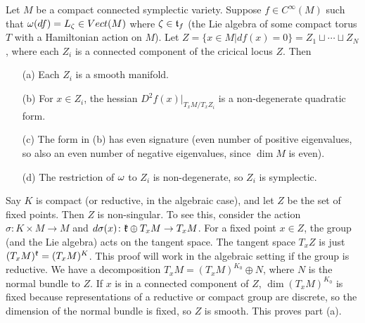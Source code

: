 
\begin{proposition}
 Let $M$ be a compact connected symplectic variety. Suppose $f\in C^\infty(M)$ such that $\omega(df)=L_\zeta\in Vect(M)$ where $\zeta\in \mathfrak{t}_f$ (the Lie algebra of some compact torus $T$ with a Hamiltonian action on $M$). Let $Z=\{x\in M|df(x)=0\}=Z_1\sqcup \cdots \sqcup Z_N$, where each $Z_i$ is a connected component of the cricical locus $Z$. Then
 \begin{enumerate}
  \item[(a)] Each $Z_i$ is a smooth manifold.
  \item[(b)] For $x\in Z_i$, the hessian $D^2f(x)|_{T_xM/T_x Z_i}$ is a non-degenerate quadratic form.
  \item[(c)] The form in (b) has even signature (even number of positive eigenvalues, so also an even number of negative eigenvalues, since $\dim M$ is even).
  \item[(d)] The restriction of $\omega$ to $Z_i$ is non-degenerate, so $Z_i$ is symplectic.
 \end{enumerate}
\end{proposition}
\begin{remark}
 Say $K$ is compact (or reductive, in the algebraic case), and let $Z$ be the set of fixed points. Then $Z$ is non-singular. To see this, consider the action $\sigma\colon K\times M\to M$ and $d\sigma(x)\colon \mathfrak{k}\oplus T_x M\to T_x M$. For a fixed point $x\in Z$, the group (and the Lie algebra) acts on the tangent space. The tangent space $T_x Z$ is just $(T_x M)^{\mathfrak{k}}=(T_x M)^K$. This proof will work in the algebraic setting if the group is reductive. We have a decomposition $T_x M=(T_x M)^{K_0}\oplus N$, where $N$ is the normal bundle to $Z$. If $x$ is in a connected component of $Z$, $\dim (T_x M)^{K_0}$ is fixed because representations of a reductive or compact group are discrete, so the dimension of the normal bundle is fixed, so $Z$ is smooth. This proves part (a).
\end{remark}
